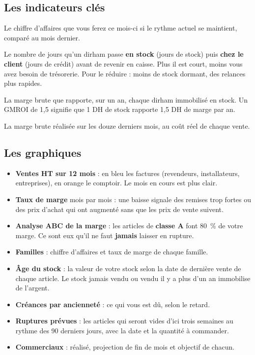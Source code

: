 \documentclass[11pt,a4paper]{report}
\begin{document}
\subsection{Les indicateurs clés}
\begin{description}[leftmargin=0pt, style=nextline]
  \item[Fin de mois projetée] Le chiffre d'affaires que vous ferez ce mois-ci si le rythme actuel se maintient, comparé au mois dernier.
  \item[Cycle de trésorerie] Le nombre de jours qu'un dirham passe \textbf{en stock} (jours de stock) puis \textbf{chez le client} (jours de crédit) avant de revenir en caisse. Plus il est court, moins vous avez besoin de trésorerie. Pour le réduire : moins de stock dormant, des relances plus rapides.
  \item[GMROI] La marge brute que rapporte, sur un an, chaque dirham immobilisé en stock. Un GMROI de 1,5 signifie que 1 DH de stock rapporte 1,5 DH de marge par an.
  \item[Marge 12 mois] La marge brute réalisée sur les douze derniers mois, au coût réel de chaque vente.
\end{description}

\subsection{Les graphiques}
\begin{itemize}
  \item \textbf{Ventes HT sur 12 mois} : en bleu les factures (revendeurs, installateurs, entreprises), en orange le comptoir. Le mois en cours est plus clair.
  \item \textbf{Taux de marge} mois par mois : une baisse signale des remises trop fortes ou des prix d'achat qui ont augmenté sans que les prix de vente suivent.
  \item \textbf{Analyse ABC de la marge} : les articles de \textbf{classe A} font 80~\% de votre marge. Ce sont eux qu'il ne faut \textbf{jamais} laisser en rupture.
  \item \textbf{Familles} : chiffre d'affaires et taux de marge de chaque famille.
  \item \textbf{Âge du stock} : la valeur de votre stock selon la date de dernière vente de chaque article. Le stock \og jamais vendu \fg{} ou vendu il y a plus d'un an immobilise de l'argent.
  \item \textbf{Créances par ancienneté} : ce qui vous est dû, selon le retard.
  \item \textbf{Ruptures prévues} : les articles qui seront vides d'ici trois semaines au rythme des 90 derniers jours, avec la date et la quantité à commander.
  \item \textbf{Commerciaux} : réalisé, projection de fin de mois et objectif de chacun.
\end{itemize}
\end{document}
